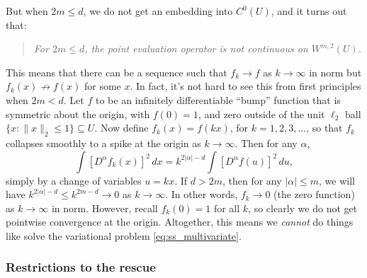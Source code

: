 \documentclass{article}
\begin{document}
But when $2m \leq d$, we do not get an embedding into $C^0(U)$, and it turns out
that:   
\begin{quote}
\centering\it
For $2m \leq d$, the point evaluation operator is not continuous on
$W^{m,2}(U)$.  
\end{quote}
This means that there can be a sequence such that $f_k \to f$ as $k \to \infty$
in  norm but $f_k(x) \not\to f(x)$ for some
$x$. In fact, it's not hard to see this from first principles when $2m < d$.
Let $f$ to be an infinitely differentiable ``bump'' function that is symmetric
about the origin, with $f(0) = 1$, and zero outside of the unit $\ell_2$ ball
$\{x : \|x\|_2 \leq 1\} \subseteq U$. Now define $f_k(x) = f(k x)$, for
$k=1,2,3,\dots$, so that $f_k$ collapses smoothly to a spike at the origin as $k 
\to \infty$. Then for any $\alpha$,
\[
\int [D^\alpha f_k(x)]^2 \, dx = k^{2|\alpha|-d} \int
[D^\alpha f(u)]^2 \, du,  
\]
simply by a change of variables $u = k x$. If $d > 2m$, then for any $|\alpha|
\leq m$, we will have $k^{2|\alpha|-d} \leq k^{2m-d} \to 0$ as $k \to
\infty$. In other words, $f_k \to 0$ (the zero function) as $k \to \infty$ in
 norm. However, recall $f_k(0) = 1$ for all $k$,
so clearly we do not get pointwise convergence at the origin. Altogether, this
means we \emph{cannot} do things like solve the variational problem
\eqref{eq:ss_multivariate}.

\subsubsection{Restrictions to the rescue}
\end{document}
